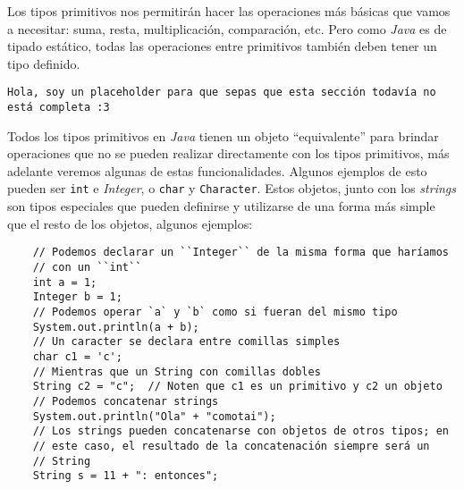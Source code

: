   Los tipos primitivos nos permitirán hacer las operaciones más básicas que vamos a necesitar: suma,
  resta, multiplicación, comparación, etc.
  Pero como \textit{Java} es de tipado estático, todas las operaciones entre primitivos también
  deben tener un tipo definido.
  
  \begin{center}
    \texttt{Hola, soy un placeholder para que sepas que esta sección todavía no está completa :3}
  \end{center}

  Todos los tipos primitivos en \textit{Java} tienen un objeto \enquote{equivalente} 
  para brindar operaciones que no se pueden realizar directamente con los tipos 
  primitivos, más adelante veremos algunas de estas funcionalidades.
  Algunos ejemplos de esto pueden ser \texttt{int} e \textit{Integer}, o 
  \texttt{char} y \texttt{Character}.
  Estos objetos, junto con los \textit{strings} son tipos especiales que pueden definirse y 
  utilizarse de una forma más simple que el resto de los objetos, algunos ejemplos:
  
  \begin{verbatim}
    // Podemos declarar un ``Integer`` de la misma forma que haríamos
    // con un ``int``
    int a = 1;
    Integer b = 1;
    // Podemos operar `a` y `b` como si fueran del mismo tipo
    System.out.println(a + b);
    // Un caracter se declara entre comillas simples
    char c1 = 'c';
    // Mientras que un String con comillas dobles
    String c2 = "c";  // Noten que c1 es un primitivo y c2 un objeto
    // Podemos concatenar strings
    System.out.println("Ola" + "comotai");
    // Los strings pueden concatenarse con objetos de otros tipos; en
    // este caso, el resultado de la concatenación siempre será un 
    // String
    String s = 11 + ": entonces";
  \end{verbatim}

